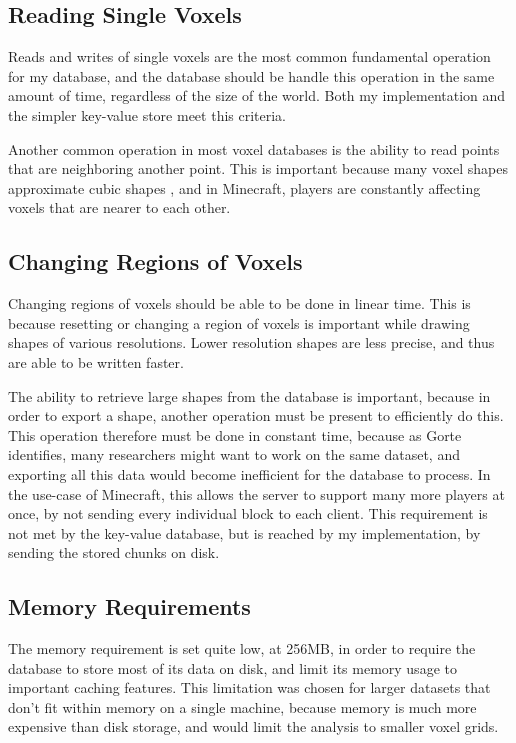 \documentclass[10pt,twocolumn]{article}
\begin{document}
\subsection{Reading Single Voxels}

Reads and writes of single voxels are the most common fundamental operation for
my database, and the database should be handle this operation in the same amount
of time, regardless of the size of the world. Both my implementation and the
simpler key-value store meet this criteria.

Another common operation in most voxel databases is the ability to read points
that are neighboring another point. This is important because many voxel shapes
approximate cubic shapes \cite{gorte2023analysis}, and in Minecraft, players are
constantly affecting voxels that are nearer to each other.

\subsection{Changing Regions of Voxels}

Changing regions of voxels should be able to be done in linear time. This is
because resetting or changing a region of voxels is important while drawing
shapes of various resolutions. Lower resolution shapes are less precise, and
thus are able to be written faster.

The ability to retrieve large shapes from the database is important, because in
order to export a shape, another operation must be present to efficiently do
this. This operation therefore must be done in constant time, because as
Gorte\cite{gorte2023analysis} identifies, many researchers might want to work
on the same dataset, and exporting all this data would become inefficient for
the database to process. In the use-case of Minecraft, this allows the server to
support many more players at once, by not sending every individual block to each
client. This requirement is not met by the key-value database, but is reached by
my implementation, by sending the stored chunks on disk.

\subsection{Memory Requirements}

The memory requirement is set quite low, at 256MB, in order to require the
database to store most of its data on disk, and limit its memory usage to
important caching features. This limitation was chosen for larger datasets that
don't fit within memory on a single machine, because memory is much more
expensive than disk storage, and would limit the analysis to smaller voxel grids.
\end{document}
